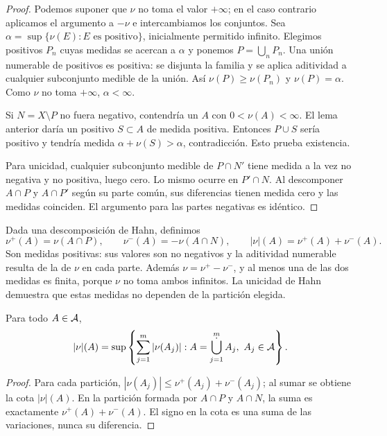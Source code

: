 \begin{proof}
Podemos suponer que $\nu$ no toma el valor $+\infty$; en el caso contrario aplicamos el argumento a $-\nu$ e intercambiamos los conjuntos. Sea $\alpha=\sup\{\nu(E):E\text{ es positivo}\}$, inicialmente permitido infinito. Elegimos positivos $P_n$ cuyas medidas se acercan a $\alpha$ y ponemos $P=\bigcup_nP_n$. Una unión numerable de positivos es positiva: se disjunta la familia y se aplica aditividad a cualquier subconjunto medible de la unión. Así $\nu(P)\ge\nu(P_n)$ y $\nu(P)=\alpha$. Como $\nu$ no toma $+\infty$, $\alpha<\infty$.

Si $N=X\setminus P$ no fuera negativo, contendría un $A$ con $0<\nu(A)<\infty$. El lema anterior daría un positivo $S\subset A$ de medida positiva. Entonces $P\cup S$ sería positivo y tendría medida $\alpha+\nu(S)>\alpha$, contradicción. Esto prueba existencia.

Para unicidad, cualquier subconjunto medible de $P\cap N'$ tiene medida a la vez no negativa y no positiva, luego cero. Lo mismo ocurre en $P'\cap N$. Al descomponer $A\cap P$ y $A\cap P'$ según su parte común, sus diferencias tienen medida cero y las medidas coinciden. El argumento para las partes negativas es idéntico.
\end{proof}
\begin{definicion}
Dada una descomposición de Hahn, definimos
\[
 \nu^+(A)=\nu(A\cap P),\qquad \nu^-(A)=-\nu(A\cap N),\qquad |\nu|(A)=\nu^+(A)+\nu^-(A).
\]
Son medidas positivas: sus valores son no negativos y la aditividad numerable resulta de la de $\nu$ en cada parte. Además $\nu=\nu^+-\nu^-$, y al menos una de las dos medidas es finita, porque $\nu$ no toma ambos infinitos. La unicidad de Hahn demuestra que estas medidas no dependen de la partición elegida.
\end{definicion}
\begin{proposicion}\label{v2:variacion-real}
Para todo $A\in\mathcal A$,
\[
 |\nu|(A)=\sup\left\{\sum_{j=1}^m|\nu(A_j)|:A=\mathop{\dot\bigcup}_{j=1}^m A_j,\ A_j\in\mathcal A\right\}.
\]
\end{proposicion}
\begin{proof}
Para cada partición, $|\nu(A_j)|\le\nu^+(A_j)+\nu^-(A_j)$; al sumar se obtiene la cota $|\nu|(A)$. En la partición formada por $A\cap P$ y $A\cap N$, la suma es exactamente $\nu^+(A)+\nu^-(A)$. El signo en la cota es una suma de las variaciones, nunca su diferencia.
\end{proof}

